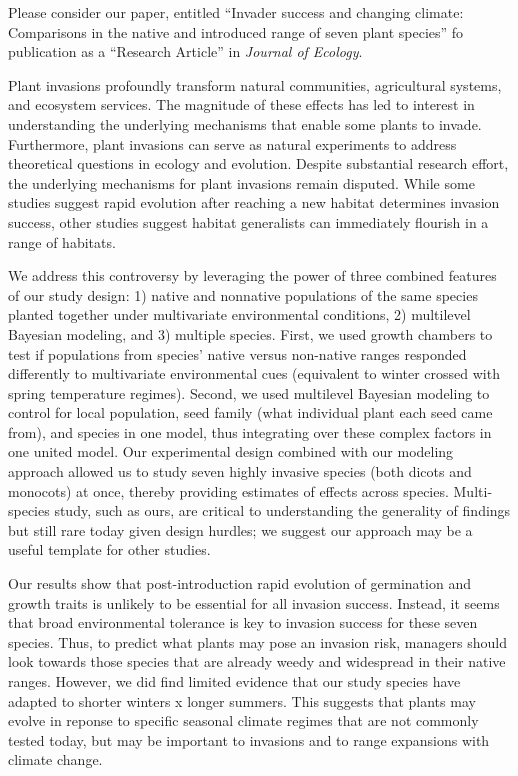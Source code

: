 \documentclass{article}
\begin{document}
	\medskip
	Please consider our paper, entitled “Invader success and changing climate: Comparisons in the native and introduced range of seven plant species” fo publication as a “Research Article” in \textit{Journal of Ecology}. \par
	Plant invasions profoundly transform natural communities, agricultural systems, and ecosystem services. The magnitude of these effects has led to interest in understanding the underlying mechanisms that enable some plants to invade. Furthermore, plant invasions can serve as natural experiments to address theoretical questions in ecology and evolution.  Despite substantial research effort, the underlying mechanisms for plant invasions remain disputed. While some studies suggest rapid evolution after reaching a new habitat determines invasion success, other studies suggest habitat generalists can immediately flourish in a range of habitats.\par 
	We address this controversy by leveraging the power of three combined features of our study design: 1) native and nonnative populations of the same species planted together under multivariate environmental conditions, 2) multilevel Bayesian modeling, and 3) multiple species. First, we used growth chambers to test if populations from species' native versus non-native ranges responded differently to multivariate environmental cues (equivalent to winter crossed with spring temperature regimes). Second, we used multilevel Bayesian modeling to control for local population, seed family (what individual plant each seed came from), and species in one model, thus integrating over these complex factors in one united model. Our experimental design combined with our modeling approach allowed us to study seven highly invasive species (both dicots and monocots) at once, thereby providing estimates of effects across species. Multi-species study, such as ours, are critical to understanding the generality of findings but still rare today given design hurdles; we suggest our approach may be a useful template for other studies.  \par %
	Our results show that post-introduction rapid evolution of germination and growth traits is unlikely to be essential for all invasion success. Instead, it seems that broad environmental tolerance is key to invasion success for these seven species. Thus, to predict what plants may pose an invasion risk, managers should look towards those species that are already weedy and widespread in their native ranges. However, we did find limited evidence that our study species have adapted to shorter winters x longer summers. This suggests that plants may evolve in reponse to specific seasonal climate regimes that are not commonly tested today, but may be important to invasions and to range expansions with climate change. 
\end{document}
